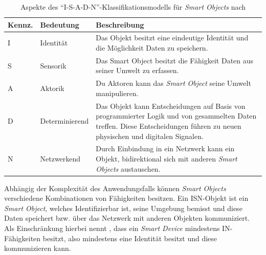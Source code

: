 \begin{table}[h]
\centering
\begin{tabularx}{\textwidth}{llX}
\hline
\rowcolor[HTML]{EFEFEF} 
Kennz. & Bedeutung & Beschreibung \\ \hline
I      & Identität      & Das Objekt besitzt eine eindeutige Identität und die Möglichkeit Daten zu speichern. \\ \hline
S      & Sensorik       & Das Smart Object besitzt die Fähigkeit Daten aus seiner Umwelt zu erfassen. \\ \hline
A      & Aktorik        & Du Aktoren kann das \textit{Smart Object} seine Umwelt manipulieren. \\ \hline
D      & Determinierend & Das Objekt kann Entscheidungen auf Basis von programmierter Logik und von gesammelten Daten treffen. Diese Entscheidungen führen zu neuen physischen und digitalen Signalen. \\ \hline
N      & Netzwerkend   & Durch Einbindung in ein Netzwerk kann ein Objekt, bidirektional sich mit anderen \textit{Smart Objects} austauschen. \\ \hline                                                        
\end{tabularx}
\caption{Aspekte des "`I-S-A-D-N"'-Klassifikationsmodells für \textit{Smart Objects} nach \cite{lopez2011taxonomy} }
\label{tab:isadnKennz}
\end{table}

Abhängig der Komplexität des Anwendungsfalls können \textit{Smart Objects} verschiedene Kombinationen von Fähigkeiten besitzen. Ein ISN-Objekt ist ein \textit{Smart Object}, welches Identifizierbar ist, seine Umgebung bemisst und diese Daten speichert bzw. über das Netzwerk mit anderen Objekten kommuniziert. Als Einschränkung hierbei nennt \cite{lopez2011taxonomy}, dass ein \textit{Smart Device} mindestens IN-Fähigkeiten besitzt, also mindestens eine Identität besitzt und diese kommunizieren kann.

